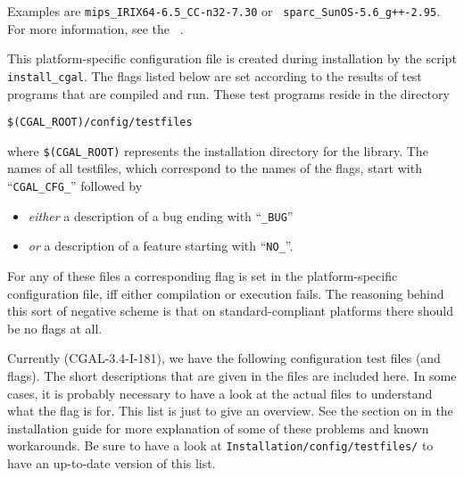 \noindent Examples are \texttt{mips\_IRIX64-6.5\_CC-n32-7.30} or {\tt
  sparc\_SunOS-5.6\_g++-2.95}. For more information, see the \cgal\ 
.
\ccIndexSubitemEnd{flag}{for OS \& compiler}

This platform-specific configuration file is created during
installation by the script \texttt{install\_cgal}. The flags listed below
are set according to the results of test programs that are compiled and run.
These test programs reside in the directory
\begin{center}
\verb|$(CGAL_ROOT)/config/testfiles|
\end{center}
where \verb|$(CGAL_ROOT)| represents the installation directory for the library.
The names of all testfiles, which correspond to the names of the flags, 
\ccIndexSubitem{workaround flags}{names}
start with ``\texttt{CGAL\_CFG\_}'' followed by
\begin{itemize}
\item \textit{either} a description of a bug ending with
  ``\texttt{\_BUG}''
\item \textit{or} a description of a feature starting with
  ``\texttt{NO\_}''.
\end{itemize}
For any of these files a corresponding flag is set in the 
platform-specific configuration file, iff either compilation or execution
fails. The reasoning behind this sort of negative scheme is that on
standard-compliant platforms there should be no flags at all.


\noindent Currently (CGAL-3.4-I-181), we have the following configuration
test files (and flags). The short descriptions that are given in the files are 
included here. In some cases, it is probably necessary to have a look at the
actual files to understand what the flag is for. This list is just to
give an overview.  See the section on
 in the installation guide
for more explanation of some of these problems and known workarounds. 
Be sure to have a look at \texttt{Installation/config/testfiles/} to have an
up-to-date version of this list.

